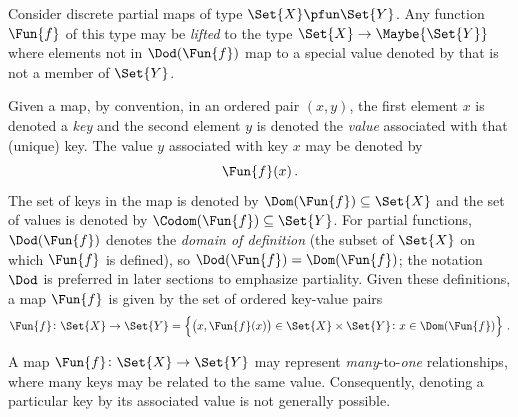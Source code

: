 \documentclass[ ../main.tex]{subfiles}
\begin{document}
Consider discrete partial maps of type $\Set{X} \pfun \Set{Y}$.
Any function $\Fun{f}$ of this type may be \emph{lifted} to the type $\Set{X} \to \Maybe{\Set{Y}}$ where elements not in $\Dod(\Fun{f})$ map to a special value denoted by \Nothing that is not a member of $\Set{Y}$.

Given a map, by convention, in an ordered pair $(x, y)$, the first element $x$ is denoted a \emph{key} and the second element $y$ is denoted the \emph{value} associated with that (unique) key. The value $y$ associated with key $x$ may be denoted by
\begin{equation}
\Fun{f}(x)\,.
\end{equation}
The set of keys in the map is denoted by $\Dom(\Fun{f}) \subseteq \Set{X}$ and the set of values is denoted by $\Codom(\Fun{f}) \subseteq \Set{Y}$.
For partial functions, $\Dod(\Fun{f})$ denotes the \emph{domain of definition} (the subset of $\Set{X}$ on which $\Fun{f}$ is defined), so $\Dod(\Fun{f}) = \Dom(\Fun{f})$; the notation $\Dod$ is preferred in later sections to emphasize partiality. Given these definitions, a map $\Fun{f}$ is given by the set of ordered key-value pairs
\begin{equation}
\Fun{f} \colon \Set{X} \to \Set{Y} = \left\{
\left(x, \Fun{f}(x)\right) \in \Set{X} \times \Set{Y} \colon x \in \Dom(\Fun{f})
\right\}\,.
\end{equation}

A map $\Fun{f} \colon \Set{X} \to \Set{Y}$ may represent \emph{many}-to-\emph{one} relationships, where many keys may be related to the same value. Consequently, denoting a particular key by its associated value is not generally possible.
\end{document}
